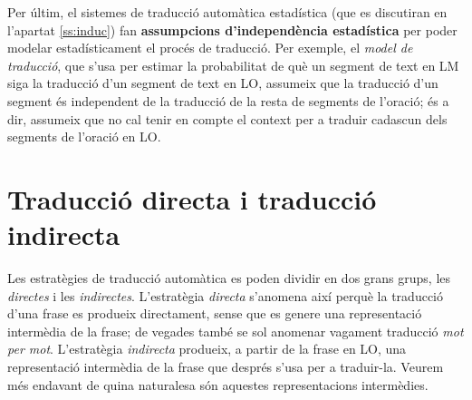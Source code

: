 
Per últim, el sistemes de traducció automàtica estadística (que es
discutiran en l'apartat \ref{ss:induc}) fan \textbf{assumpcions
  d'independència estadística} per poder modelar estadísticament el
procés de traducció. Per exemple, el \emph{model de traducció}, que
s'usa per estimar la probabilitat de què un segment de text en LM siga
la traducció d'un segment de text en LO, assumeix que la traducció
d'un segment és independent de la traducció de la resta de segments de
l'oració; és a dir, assumeix que no cal tenir en compte el context per
a traduir cadascun dels segments de l'oració en LO.

\section{Traducció directa i traducció indirecta}
\label{ss:dirindir} 
Les estratègies de traducció automàtica es poden dividir en dos grans
grups, les \emph{directes} i les \emph{indirectes}. L'estratègia
\emph{directa} s'anomena així perquè la traducció d'una frase es
produeix directament, sense que es genere una representació intermèdia
de la frase; de vegades també se sol anomenar vagament traducció
\emph{mot per mot}. L'estratègia \emph{indirecta} produeix, a partir
de la frase en LO, una representació intermèdia de la frase que
després s'usa per a traduir-la. Veurem més endavant de quina
naturalesa són aquestes representacions intermèdies.

